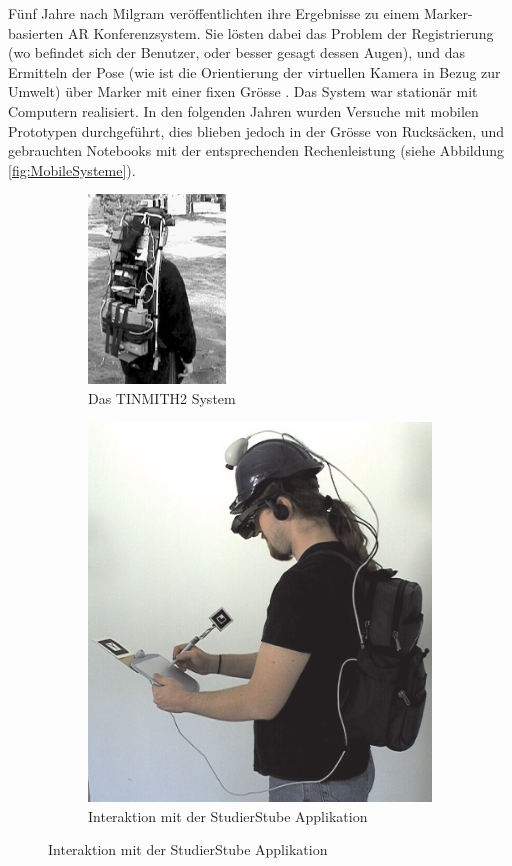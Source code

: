 \documentclass[a4paper]{scrreprt}
\begin{document}
Fünf Jahre nach Milgram veröffentlichten \citeauthor{Kato1999} ihre Ergebnisse zu einem Marker-basierten AR Konferenzsystem. Sie lösten dabei das Problem der Registrierung (wo befindet sich der Benutzer, oder besser gesagt dessen Augen), und das Ermitteln der Pose (wie ist die Orientierung der virtuellen Kamera in Bezug zur Umwelt) über Marker mit einer fixen Grösse \parencite{Kato1999}. Das System war stationär mit Computern realisiert. In den folgenden Jahren wurden Versuche mit  mobilen Prototypen durchgeführt, dies blieben jedoch in der Grösse von Rucksäcken, und gebrauchten Notebooks mit der entsprechenden Rechenleistung (siehe Abbildung \ref{fig:MobileSysteme}).

\begin{figure}[h!]
	\centering
	\begin{subfigure}[t]{0.45\textwidth}
		\centering
		\includegraphics[keepaspectratio, width=0.4\textwidth]{tinmith2.png}
		\caption{Das TINMITH2 System \parencite{Thomas1999}}
	\end{subfigure}
	\quad
	\begin{subfigure}[t]{0.45\textwidth}
		\centering
		\includegraphics[keepaspectratio]{Studierstube2001.png}
		\caption{Interaktion mit der StudierStube Applikation \parencite{Reitmayr2001}}
	\end{subfigure}


\end{figure}
\end{document}
